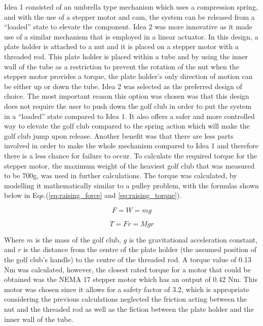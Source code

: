 \documentclass[11pt,landscape]{article}
\begin{document}
\begin{multicols}{2}
    Idea 1 consisted of an umbrella type mechanism which uses a compression
    spring, and with the use of a stepper motor and cam, the system can be
    released from a “loaded” state to elevate the component. Idea 2 was more
    innovative as it made use of a similar mechanism that is employed in a linear actuator. In this design, a plate holder is
    attached to a nut and it is placed on a stepper motor with a threaded rod.
    This plate holder is placed within a tube and by using the inner wall of the
    tube as a restriction to prevent the rotation of the nut when the stepper
    motor provides a torque, the plate holder’s only direction of motion can be
    either up or down the tube. Idea 2 was selected as the preferred design of
    choice. The most important reason this option was chosen was that this
    design does not require the user to push down the golf club in order to put
    the system in a “loaded” state compared to Idea 1. It also offers a safer
    and more controlled way to elevate the golf club compared to the spring
    action which will make the golf club jump upon release. Another benefit was
    that there are less parts involved in order to make the whole mechanism
    compared to Idea 1 and therefore there is a less chance for failure to
    occur. To calculate the required torque for the stepper motor, the maximum
    weight of the heaviest golf club that was measured to be 700g, was used in further
    calculations. The torque was calculated, by modelling it mathematically similar to a pulley problem, with the
    formulas shown below in Eqs.(\ref{eq:raising_force} and \ref{eq:raising_torque}).
    
    \begin{center}
        \begin{equation}
            F = W = mg
            \label{eq:raising_force}
        \end{equation}
    \end{center}
    \begin{center}
        \begin{equation}
            T = Fr = Mgr
            \label{eq:raising_torque}
        \end{equation}
    \end{center}
    
    Where $m$ is the mass of the golf club, $g$ is the gravitational
    acceleration constant, and $r$ is the distance from the centre of the plate
    holder (the assumed position of the golf club’s handle) to the centre of the
    threaded rod. A torque value of 0.13 Nm was calculated, however, the closest
    rated torque for a motor that could be obtained was the NEMA 17 stepper
    motor which has an output of 0.42 Nm. This motor was chosen since it allows
    for a safety factor of 3.2, which is appropriate considering the previous
    calculations neglected the friction acting between the nut and the threaded
    rod as well as the fiction between the plate holder and the inner wall of
    the tube. 
    

\end{multicols}
\end{document}
